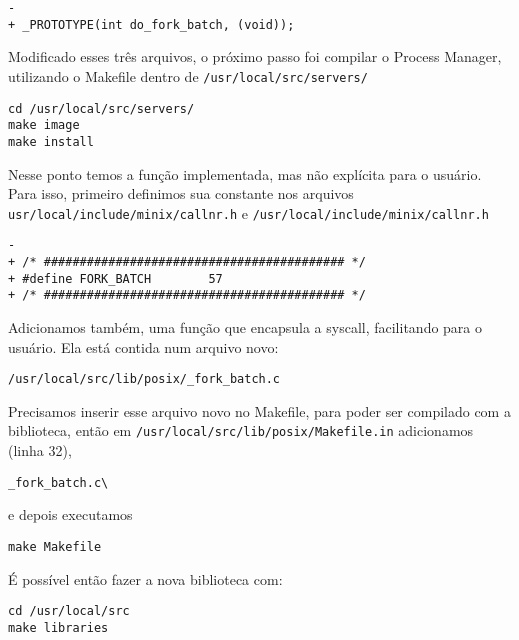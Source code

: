 \documentclass{amsart}
\theoremstyle{plain}
\newcommand{\code}[1]{\lstinline[mathescape=true]{#1}}
\begin{document}
\begin{lstlisting}[frame=leftline,mathescape=true,style=nonumbers]
-
+ _PROTOTYPE(int do_fork_batch, (void));
\end{lstlisting}

Modificado esses três arquivos, o próximo passo foi compilar o Process Manager, utilizando o
Makefile dentro de \code{/usr/local/src/servers/}

\begin{lstlisting}[frame=leftline,mathescape=true,style=nonumbers]
cd /usr/local/src/servers/
make image
make install
\end{lstlisting}

Nesse ponto temos a função implementada, mas não explícita para o usuário. Para isso, primeiro
definimos sua constante nos arquivos \code{usr/local/include/minix/callnr.h} e
\code{/usr/local/include/minix/callnr.h}

\begin{lstlisting}[frame=leftline,mathescape=true,style=nonumbers]
-
+ /* ########################################## */
+ #define FORK_BATCH        57
+ /* ########################################## */
\end{lstlisting}

Adicionamos também, uma função que encapsula a syscall, facilitando para o usuário. Ela está
contida num arquivo novo:

\begin{lstlisting}[frame=leftline,mathescape=true,style=nonumbers]
/usr/local/src/lib/posix/_fork_batch.c
\end{lstlisting}

Precisamos inserir esse arquivo novo no Makefile, para poder ser compilado com a biblioteca, então
em \code{/usr/local/src/lib/posix/Makefile.in} adicionamos (linha 32),

\begin{lstlisting}[frame=leftline,mathescape=true,style=nonumbers]
_fork_batch.c\
\end{lstlisting}

e depois executamos

\begin{lstlisting}[frame=leftline,mathescape=true,style=nonumbers]
make Makefile
\end{lstlisting}

É possível então fazer a nova biblioteca com:

\begin{lstlisting}[frame=leftline,mathescape=true,style=nonumbers]
cd /usr/local/src
make libraries
\end{lstlisting}
\end{document}
